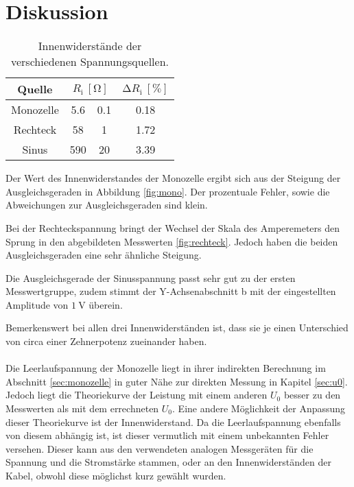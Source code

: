 \section{Diskussion}
\label{sec:Diskussion}
\begin{table}
      \caption{Innenwiderstände der verschiedenen Spannungsquellen.}
      \label{tab:innenR}
      \centering
      \begin{tabular}{c S[table-format=3.1] @{${}\pm{}$} S[table-format=2.1] S[table-format=1.2]}
            \toprule
            {Quelle} &  & {$\increment R_\text{i} \: [\si{\percent}]$} \\
            \midrule
            Monozelle &   5.6 &  0.1 & 0.18 \\
            Rechteck  &  58   &  1   & 1.72 \\
            Sinus     & 590   & 20   & 3.39 \\
            \bottomrule
      \end{tabular}
\end{table}
\noindent Der Wert des Innenwiderstandes der Monozelle ergibt sich aus der Steigung
der Ausgleichsgeraden in Abbildung \ref{fig:mono}. Der prozentuale Fehler,
sowie die Abweichungen zur Ausgleichsgeraden sind klein.

\noindent Bei der Rechteckspannung bringt der Wechsel der Skala des Amperemeters den Sprung
in den abgebildeten Messwerten \ref{fig:rechteck}. Jedoch haben die beiden Ausgleichsgeraden
eine sehr ähnliche Steigung.

\noindent Die Ausgleichsgerade der Sinusspannung passt sehr gut zu der ersten Messwertgruppe,
zudem stimmt der Y-Achsenabschnitt b mit der eingestellten Amplitude von $\SI{1}{\volt}$
überein.

\noindent Bemerkenswert bei allen drei Innenwiderständen ist, dass sie je einen Unterschied
von circa einer Zehnerpotenz zueinander haben.
\\
\\
Die Leerlaufspannung der Monozelle liegt in ihrer indirekten Berechnung im Abschnitt
\ref{sec:monozelle} in guter Nähe zur direkten Messung in Kapitel \ref{sec:u0}.
Jedoch liegt die Theoriekurve der Leistung mit einem anderen $U_0$ besser zu den
Messwerten als mit dem errechneten $U_0$. Eine andere Möglichkeit der Anpassung
dieser Theoriekurve ist der Innenwiderstand. Da die Leerlaufspannung ebenfalls
von diesem abhängig ist, ist dieser vermutlich mit einem unbekannten Fehler versehen.
Dieser kann aus den verwendeten analogen Messgeräten für die Spannung und die Stromstärke
stammen, oder an den Innenwiderständen der Kabel, obwohl diese möglichst kurz gewählt wurden.
